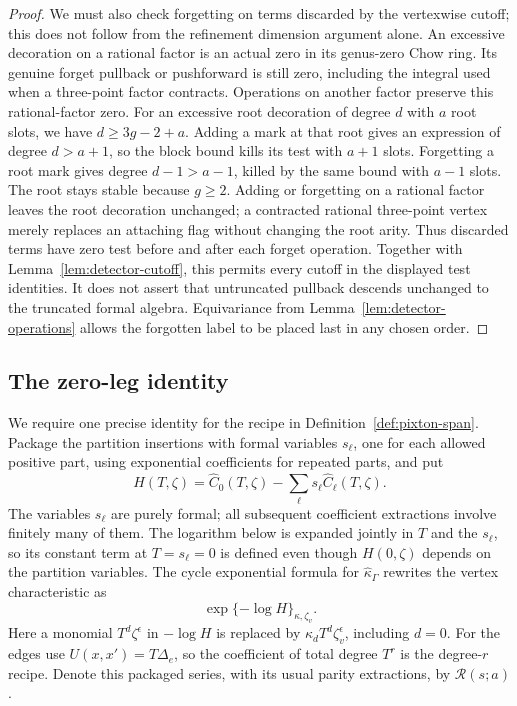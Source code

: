 \begin{proof}
We must also check forgetting on terms discarded by the
vertexwise cutoff; this does not follow from the refinement
dimension argument alone.  An excessive decoration on a
rational factor is an actual zero in its genus-zero Chow
ring.  Its genuine forget pullback or pushforward is still
zero, including the integral used when a three-point factor
contracts.  Operations on another factor preserve this
rational-factor zero.
For an excessive root decoration of degree \(d\) with
\(a\) root slots, we have \(d\geq3g-2+a\).  Adding a mark
at that root gives an expression of degree \(d>a+1\),
so the block bound kills its test with \(a+1\) slots.
Forgetting a root mark gives degree \(d-1>a-1\), killed
by the same bound with \(a-1\) slots.  The root stays stable
because \(g\geq2\).  Adding or forgetting on a rational
factor leaves the root decoration unchanged; a contracted
rational three-point vertex merely replaces an attaching
flag without changing the root arity.
Thus discarded terms have zero test before and after each
forget operation.  Together with
Lemma~\ref{lem:detector-cutoff}, this permits every cutoff
in the displayed test identities.  It does not assert that
untruncated pullback descends unchanged to the truncated
formal algebra.
Equivariance from Lemma~\ref{lem:detector-operations} allows
the forgotten label to be placed last in any chosen order.
\end{proof}

\subsection{The zero-leg identity}

We require one precise identity for the recipe in
Definition~\ref{def:pixton-span}.  Package the partition
insertions with formal variables \(s_\ell\), one for each
allowed positive part, using exponential coefficients for
repeated parts, and put
\[
 H(T,\zeta)=\widehat C_0(T,\zeta)
             -\sum_\ell s_\ell\widehat C_\ell(T,\zeta).
\]
The variables \(s_\ell\) are purely formal; all subsequent
coefficient extractions involve finitely many of them. The logarithm
below is expanded jointly in \(T\) and the \(s_\ell\), so its constant
term at \(T=s_\ell=0\) is defined even though \(H(0,\zeta)\) depends
on the partition variables.
The cycle exponential formula for \(\widehat\kappa_\Gamma\)
rewrites the vertex characteristic as
\begin{equation}
 \exp\{-\log H\}_{\kappa,\zeta_v}.
 \label{eq:detector-characteristic}
\end{equation}
Here a monomial \(T^d\zeta^\epsilon\) in \(-\log H\) is
replaced by \(\kappa_dT^d\zeta_v^\epsilon\), including \(d=0\).
For the edges use \(U(x,x')=T\Delta_e\), so the coefficient
of total degree \(T^r\) is the degree-\(r\) recipe.
Denote this packaged series, with its usual parity
extractions, by \(\mathcal R(s;a)\).

